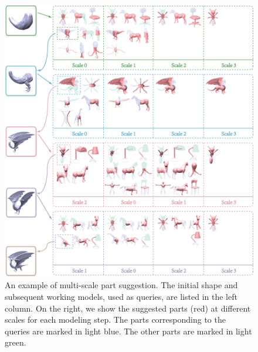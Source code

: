 \begin{figure}[t]\centering
\includegraphics[width=1.05\linewidth]{./Material/MSPS.pdf}
\caption{An example of multi-scale part suggestion. The initial shape and subsequent working models, used as queries, are listed in the left column. On the right, we show the suggested parts (red) at different scales for each modeling step. The parts corresponding to the queries are marked in light blue. The other parts are marked in light green.}\label{fig:MSPS}
\end{figure}
